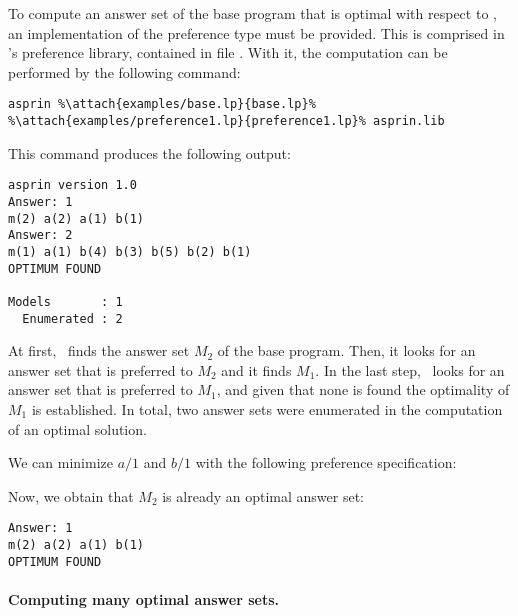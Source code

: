 \begin{example}
To compute an answer set of the base program that is optimal with respect to , 
an implementation of the preference type  must be provided.
This is comprised in \asprin's preference library,
contained in file .
With it, the computation can be performed by the following command:
%
%
\begin{lstlisting}[numbers=none,escapechar=\%]
asprin %\attach{examples/base.lp}{base.lp}% %\attach{examples/preference1.lp}{preference1.lp}% asprin.lib
\end{lstlisting}
%
This command produces the following output:
%
\begin{lstlisting}[numbers=none]
asprin version 1.0
Answer: 1
m(2) a(2) a(1) b(1)
Answer: 2
m(1) a(1) b(4) b(3) b(5) b(2) b(1)
OPTIMUM FOUND

Models       : 1
  Enumerated : 2

\end{lstlisting}
%
At first, \asprin\ finds the answer set $M_2$ of the base program. 
Then, it looks for an answer set that is preferred to $M_2$ and it finds $M_1$. 
In the last step, \asprin\ looks for an answer set that is preferred to $M_1$,  
and given that none is found the optimality of $M_1$ is established. 
In total, two answer sets were enumerated in the computation of an optimal solution.

We can minimize $a/1$ and $b/1$ with the following preference specification:
%

%
Now, we obtain that $M_2$ is already an optimal answer set: 
\begin{lstlisting}[numbers=none]
Answer: 1
m(2) a(2) a(1) b(1)
OPTIMUM FOUND
\end{lstlisting}
\end{example}

\paragraph{Computing many optimal answer sets.}

